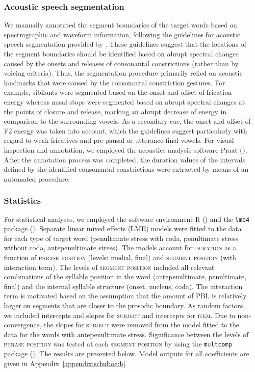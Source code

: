 \documentclass[output=paper]{langscibook}
\begin{document}
\subsubsection{Acoustic speech segmentation}
We manually annotated the segment boundaries of the target words based on spectrographic and waveform information, following the guidelines for acoustic speech segmentation provided by \citet{TurkEtal2006}. These guidelines suggest that the locations of the segment boundaries should be identified based on abrupt spectral changes caused by the onsets and releases of consonantal constrictions (rather than by voicing criteria). Thus, the segmentation procedure primarily relied on acoustic landmarks that were caused by the consonantal constriction gestures. For example, sibilants were segmented based on the onset and offset of frication energy whereas nasal stops were segmented based on abrupt spectral changes at the points of closure and release, marking an abrupt decrease of energy in comparison to the surrounding vowels. As a secondary cue, the onset and offset of F2 energy was taken into account, which the guidelines suggest particularly with regard to weak fricatives and pre-pausal or utterance-final vowels. For visual inspection and annotation, we employed the acoustics analysis software Praat (\citealt{BoersmaWeenink2019}). After the annotation process was completed, the duration values of the intervals defined by the identified consonantal constrictions were extracted by means of an automated procedure.

\subsubsection{Statistics}
For statistical analyses, we employed the software environment R (\citealt{RCoreTeam2019}) and the \texttt{lme4} package (\citealt{BatesEtal2015}). Separate linear mixed effects (LME) models were fitted to the data for each type of target word (penultimate stress with coda, penultimate stress without coda, antepenultimate stress). The models account for \textsc{duration} as a function of \textsc{phrase position} (levels: medial, final) and \textsc{segment position} (with interaction term). The levels of \textsc{segment position} included all relevant combinations of the syllable position in the word (antepenultimate, penultimate, final) and the internal syllable structure (onset, nucleus, coda). The interaction term is motivated based on the assumption that the amount of PBL is relatively larger on segments that are closer to the prosodic boundary. As random factors, we included intercepts and slopes for \textsc{subject} and intercepts for \textsc{item}. Due to non-convergence, the slopes for \textsc{subject} were removed from the model fitted to the data for the words with antepenultimate stress. Significance between the levels of \textsc{phrase position} was tested at each \textsc{segment position} by using the \texttt{multcomp} package (\citealt{HothornEtal2008}). The results are presented below. Model outputs for all coefficients are given in Appendix~\ref{appendix:schuboe:b}.
\end{document}
